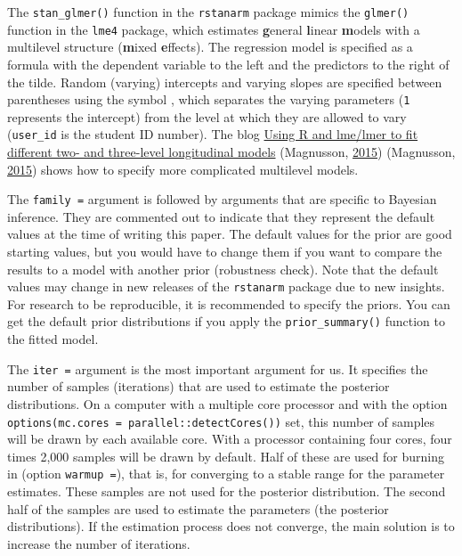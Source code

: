 \documentclass[doc]{apa6}
\begin{document}
The \texttt{stan\_glmer()} function in the \texttt{rstanarm} package
mimics the \texttt{glmer()} function in the \texttt{lme4} package, which
estimates \textbf{g}eneral \textbf{l}inear \textbf{m}odels with a
multilevel structure (\textbf{m}ixed \textbf{e}ffects). The regression
model is specified as a formula with the dependent variable to the left
and the predictors to the right of the tilde. Random (varying)
intercepts and varying slopes are specified between parentheses using
the symbol \texttt{\textbar{}}, which separates the varying parameters
(\texttt{1} represents the intercept) from the level at which they are
allowed to vary (\texttt{user\_id} is the student ID number). The blog
\href{https://rpsychologist.com/r-guide-longitudinal-lme-lmer}{Using R
and lme/lmer to fit different two- and three-level longitudinal models}
(Magnusson, \protect\hyperlink{ref-magnussonUsingLmeLmer2015}{2015})
(Magnusson, \protect\hyperlink{ref-magnussonUsingLmeLmer2015}{2015})
shows how to specify more complicated multilevel models.

The \texttt{family\ =} argument is followed by arguments that are
specific to Bayesian inference. They are commented out to indicate that
they represent the default values at the time of writing this paper. The
default values for the prior are good starting values, but you would
have to change them if you want to compare the results to a model with
another prior (robustness check). Note that the default values may
change in new releases of the \texttt{rstanarm} package due to new
insights. For research to be reproducible, it is recommended to specify
the priors. You can get the default prior distributions if you apply the
\texttt{prior\_summary()} function to the fitted model.

The \texttt{iter\ =} argument is the most important argument for us. It
specifies the number of samples (iterations) that are used to estimate
the posterior distributions. On a computer with a multiple core
processor and with the option
\texttt{options(mc.cores\ =\ parallel::detectCores())} set, this number
of samples will be drawn by each available core. With a processor
containing four cores, four times 2,000 samples will be drawn by
default. Half of these are used for burning in (option
\texttt{warmup\ =}), that is, for converging to a stable range for the
parameter estimates. These samples are not used for the posterior
distribution. The second half of the samples are used to estimate the
parameters (the posterior distributions). If the estimation process does
not converge, the main solution is to increase the number of iterations.
\end{document}
